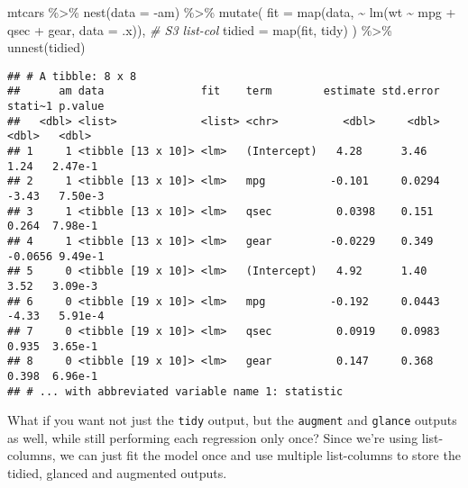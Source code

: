 \documentclass[
]{book}
\newenvironment{Shaded}{\begin{snugshade}}{\end{snugshade}}
\newcommand{\AttributeTok}[1]{\textcolor[rgb]{0.77,0.63,0.00}{#1}}
\newcommand{\CommentTok}[1]{\textcolor[rgb]{0.56,0.35,0.01}{\textit{#1}}}
\newcommand{\FunctionTok}[1]{\textcolor[rgb]{0.00,0.00,0.00}{#1}}
\newcommand{\NormalTok}[1]{#1}
\newcommand{\SpecialCharTok}[1]{\textcolor[rgb]{0.00,0.00,0.00}{#1}}
\begin{document}
\begin{Shaded}
\begin{Highlighting}[]
\NormalTok{mtcars }\SpecialCharTok{\%\textgreater{}\%}
  \FunctionTok{nest}\NormalTok{(}\AttributeTok{data =} \SpecialCharTok{{-}}\NormalTok{am) }\SpecialCharTok{\%\textgreater{}\%}
  \FunctionTok{mutate}\NormalTok{(}
    \AttributeTok{fit =} \FunctionTok{map}\NormalTok{(data, }\SpecialCharTok{\textasciitilde{}} \FunctionTok{lm}\NormalTok{(wt }\SpecialCharTok{\textasciitilde{}}\NormalTok{ mpg }\SpecialCharTok{+}\NormalTok{ qsec }\SpecialCharTok{+}\NormalTok{ gear, }\AttributeTok{data =}\NormalTok{ .x)), }\CommentTok{\# S3 list{-}col}
    \AttributeTok{tidied =} \FunctionTok{map}\NormalTok{(fit, tidy)}
\NormalTok{  ) }\SpecialCharTok{\%\textgreater{}\%}
  \FunctionTok{unnest}\NormalTok{(tidied)}
\end{Highlighting}
\end{Shaded}

\begin{verbatim}
## # A tibble: 8 x 8
##      am data               fit    term        estimate std.error stati~1 p.value
##   <dbl> <list>             <list> <chr>          <dbl>     <dbl>   <dbl>   <dbl>
## 1     1 <tibble [13 x 10]> <lm>   (Intercept)   4.28      3.46    1.24   2.47e-1
## 2     1 <tibble [13 x 10]> <lm>   mpg          -0.101     0.0294 -3.43   7.50e-3
## 3     1 <tibble [13 x 10]> <lm>   qsec          0.0398    0.151   0.264  7.98e-1
## 4     1 <tibble [13 x 10]> <lm>   gear         -0.0229    0.349  -0.0656 9.49e-1
## 5     0 <tibble [19 x 10]> <lm>   (Intercept)   4.92      1.40    3.52   3.09e-3
## 6     0 <tibble [19 x 10]> <lm>   mpg          -0.192     0.0443 -4.33   5.91e-4
## 7     0 <tibble [19 x 10]> <lm>   qsec          0.0919    0.0983  0.935  3.65e-1
## 8     0 <tibble [19 x 10]> <lm>   gear          0.147     0.368   0.398  6.96e-1
## # ... with abbreviated variable name 1: statistic
\end{verbatim}

What if you want not just the \texttt{tidy} output, but the \texttt{augment} and \texttt{glance} outputs as well, while still performing each regression only once? Since we're using list-columns, we can just fit the model once and use multiple list-columns to store the tidied, glanced and augmented outputs.
\end{document}

